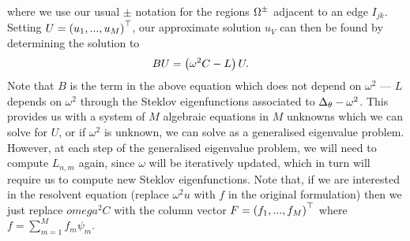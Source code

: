 \documentclass[11pt]{report}
\begin{document}
where we use our usual $\pm$ notation for the regions $\Omega^{\pm}$ adjacent to an edge $I_{jk}$.
Setting $U = \left( u_1, ..., u_M \right)^\top$, our approximate solution $u_V$ can then be found by determining the solution to
\begin{align*}
	B U &= \left( \omega^2 C - L \right) U.
\end{align*}
Note that $B$ is the term in the above equation which does not depend on $\omega^2$ --- $L$ depends on $\omega^2$ through the Steklov eigenfunctions associated to $\Delta_{\theta}-\omega^2$.
This provides us with a system of $M$ algebraic equations in $M$ unknowns which we can solve for $U$, or if $\omega^2$ is unknown, we can solve as a generalised eigenvalue problem.
However, at each step of the generalised eigenvalue problem, we will need to compute $L_{n,m}$ again, since $\omega$ will be iteratively updated, which in turn will require us to compute new Steklov eigenfunctions.
Note that, if we are interested in the resolvent equation (replace $\omega^2 u$ with $f$ in the original formulation) then we just replace $omega^2 C$ with the column vector $F=\left( f_1,...,f_M \right)^\top$ where $f = \sum_{m=1}^M f_m\psi_m$.
\end{document}
